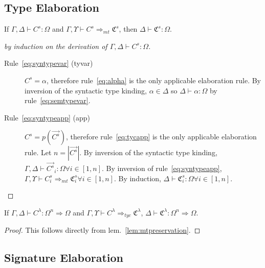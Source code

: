 \subsection{Type Elaboration}
\begin{lemma}\label{lem:mtpreservation}
If $\Gamma,\Delta\vdash C^s : \Omega$ and $\Gamma,\Upsilon\vdash C^s \Rightarrow_{mt} \mathfrak{C}^s$, then $\Delta\vdash \mathfrak{C}^s : \Omega$. 
\end{lemma}
\begin{proof}[by induction on the derivation of $\Gamma,\Delta\vdash C^s : \Omega$]
\begin{description}
\item[Rule~\ref{eq:syntypevar} (tyvar)] $C^s = \alpha$, therefore rule~\ref{eq:alpha} is the only applicable elaboration rule. By inversion of the syntactic type kinding, $\alpha\in \Delta$ so $\Delta\vdash \alpha : \Omega$ by rule~\ref{eq:semtypevar}.
\item[Rule~\ref{eq:syntypeapp} (app)] $C^s = p(\vec{C^s})$, therefore rule~\ref{eq:tycapp} is the only applicable elaboration rule. Let $n=|\vec{C^s}|$. By inversion of the syntactic type kinding, $\Gamma,\Delta\vdash \vec{C^s}_i : \Omega \forall i\in[1,n]$. By inversion of rule~\ref{eq:syntypeapp}, $\Gamma,\Upsilon\vdash C^s_i  \Rightarrow_{mt} \mathfrak{C}^s_i \forall i\in[1,n]$. By induction, $\Delta\vdash \mathfrak{C}^s_i : \Omega \forall i\in[1,n]$.
\end{description}
\end{proof}

\begin{lemma}
If $\Gamma,\Delta\vdash C^\lambda : \Omega^n \Rightarrow \Omega$ and $\Gamma,\Upsilon\vdash C^\lambda \Rightarrow_{tyc} \mathfrak{C}^\lambda$, $\Delta\vdash \mathfrak{C}^\lambda : \Omega^n \Rightarrow \Omega$.
\end{lemma}
\begin{proof}
This follows directly from lem.~\ref{lem:mtpreservation}.
\end{proof}


\subsection{Signature Elaboration}

